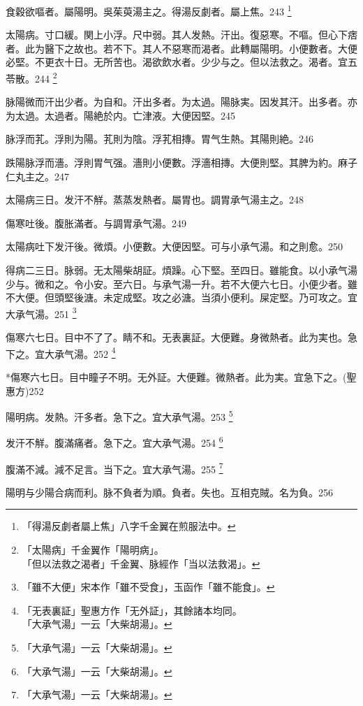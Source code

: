 \documentclass[12pt,twoside,UTF8,b5paper]{ctexbook}
\begin{document}
食穀欲嘔者。屬陽明。{吳}茱萸湯主之。得湯反劇者。屬上焦。243
	\footnote{「得湯反劇者屬上焦」八字千金翼在煎服法中。}

太陽病。寸{口}緩。関{上小}浮。尺{中}弱。其人发熱。汗出。復惡寒。不嘔。但心下痞者。此为醫下之故也。若不下。其人不惡寒而渴者。此轉屬陽明。小便數者。大便必堅。不更衣十日。无所苦也。{渴}欲飲水者。少少与之。但以法救之。渴者。宜五苓散。244
	\footnote{「太陽病」千金翼作「陽明病」。\\「但以法救之渴者」千金翼、脉經作「当以法救渴」。}

脉陽微而汗出少者。为自和。汗出多者。为太過。陽脉実。因发其汗。出多者。亦为太過。太過者。陽絶於内。亡津液。大便因堅。245

脉浮而芤。浮則为陽。芤則为陰。浮芤相摶。胃气生熱。其陽則絶。246

跌陽脉浮而濇。浮則胃气强。濇則小便數。浮濇相摶。大便則堅。其脾为約。麻子仁丸主之。247

太陽病三日。发汗不觧。蒸蒸发熱者。屬胃也。{調胃}承气湯主之。248

傷寒吐後。腹胀滿者。与{調胃}承气湯。249

太陽病吐下发汗後。微煩。小便數。大便因堅。可与小承气湯。和之則愈。250

得病二三日。脉弱。无太陽柴胡証。煩躁。心下堅。至四日。雖能食。以{小}承气湯少与。微和之。令小安。至六日。与承气湯一升。若不大便六七日。小便少者。雖不大便。但頭堅後溏。未定成堅。攻之必溏。当須小便利。屎定堅。乃可攻之。宜{大}承气湯。251
	\footnote{「雖不大便」宋本作「雖不受食」，玉函作「雖不能食」。}

傷寒六七日。目中不了了。睛不和。无表裏証。大便難。身微熱者。此为実也。急下之。宜{大}承气湯。252
	\footnote{「无表裏証」聖惠方作「无外証」，其餘諸本均同。\\「大承气湯」一云「大柴胡湯」。}

*傷寒六七日。目中瞳子不明。无外証。大便難。微熱者。此为実。宜急下之。(聖惠方)252

陽明病。发熱。汗多者。急下之。宜{大}承气湯。253
	\footnote{「大承气湯」一云「大柴胡湯」。}

发汗不觧。腹滿痛者。急下之。宜{大}承气湯。254
	\footnote{「大承气湯」一云「大柴胡湯」。}

腹滿不減。減不足言。当下之。宜{大}承气湯。255
	\footnote{「大承气湯」一云「大柴胡湯」。}

陽明与少陽合病而利。脉不負者为順。負者。失也。互相克賊。名为負。256
\end{document}
